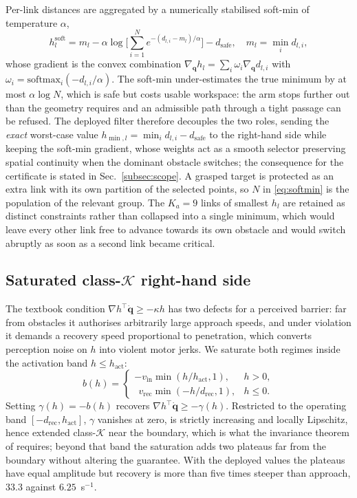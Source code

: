 \documentclass[journal]{IEEEtran}
\newcommand{\qdot}{\dot{\mathbf{q}}}
\newcommand{\dsafe}{d_{\mathrm{safe}}}
\begin{document}
Per-link distances are aggregated by a numerically stabilised soft-min of temperature $\alpha$,
\begin{equation}\label{eq:softmin}
h^{\mathrm{soft}}_l=m_l-\alpha\log\!\Big[\sum_{i=1}^{N}e^{-(d_{l,i}-m_l)/\alpha}\Big]-\dsafe,\quad m_l=\min_i d_{l,i},
\end{equation}
whose gradient is the convex combination $\nabla_{\mathbf{q}}h_l=\sum_i\omega_i\nabla_{\mathbf{q}}d_{l,i}$ with $\omega_i=\mathrm{softmax}_i(-d_{l,i}/\alpha)$. The soft-min under-estimates the true minimum by at most $\alpha\log N$, which is safe but costs usable workspace: the arm stops further out than the geometry requires and an admissible path through a tight passage can be refused. The deployed filter therefore decouples the two roles, sending the \emph{exact} worst-case value $h_{\min,l}=\min_i d_{l,i}-\dsafe$ to the right-hand side while keeping the soft-min gradient, whose weights act as a smooth selector preserving spatial continuity when the dominant obstacle switches; the consequence for the certificate is stated in Sec.~\ref{subsec:scope}. A grasped target is protected as an extra link with its own partition of the selected points, so $N$ in \eqref{eq:softmin} is the population of the relevant group. The $K_a=9$ links of smallest $h_l$ are retained as distinct constraints rather than collapsed into a single minimum, which would leave every other link free to advance towards its own obstacle and would switch abruptly as soon as a second link became critical.

\subsection{Saturated class-$\mathcal{K}$ right-hand side}
The textbook condition $\nabla h^{\top}\qdot\ge-\kappa h$ has two defects for a perceived barrier: far from obstacles it authorises arbitrarily large approach speeds, and under violation it demands a recovery speed proportional to penetration, which converts perception noise on $h$ into violent motor jerks. We saturate both regimes inside the activation band $h\le h_{\mathrm{act}}$:
\begin{equation}\label{eq:bh}
b(h)=
\begin{cases}
-v_{\mathrm{in}}\min(h/h_{\mathrm{act}},1), & h>0,\\[2pt]
\ \ v_{\mathrm{rec}}\min(-h/d_{\mathrm{rec}},1), & h\le 0.
\end{cases}
\end{equation}
Setting $\gamma(h)=-b(h)$ recovers $\nabla h^{\top}\qdot\ge-\gamma(h)$. Restricted to the operating band $[-d_{\mathrm{rec}},h_{\mathrm{act}}]$, $\gamma$ vanishes at zero, is strictly increasing and locally Lipschitz, hence extended class-$\mathcal{K}$ near the boundary, which is what the invariance theorem of \cite{Ames2019Control} requires; beyond that band the saturation adds two plateaus far from the boundary without altering the guarantee. With the deployed values the plateaus have equal amplitude but recovery is more than five times steeper than approach, $33.3$ against $6.25$~s$^{-1}$.
\end{document}
